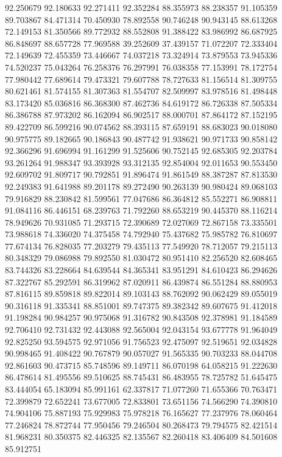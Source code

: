 92.250679
92.180633
92.271411
92.352284
88.355973
88.238357
91.105359
89.703867
84.471314
70.450930
78.892558
90.746248
90.943145
88.613268
72.149153
81.350566
89.772932
88.552808
91.388422
83.986992
86.687925
86.848697
88.657728
77.969588
39.252609
37.439157
71.072207
72.333404
72.149639
72.455359
73.446667
74.037218
73.324914
73.879553
73.945336
74.520237
75.043264
76.258376
76.297991
76.038358
77.153991
78.172754
77.980442
77.689614
79.473321
79.607788
78.727633
81.156514
81.309755
80.621461
81.574155
81.307363
81.554707
82.509997
83.978516
81.498448
83.173420
85.036816
86.368300
87.462736
84.619172
86.726338
87.505334
86.386788
87.973202
86.162094
86.902517
88.000701
87.864172
87.152195
89.422709
86.599216
90.074562
88.393115
87.659191
88.683023
90.018080
90.975775
89.182665
90.186843
90.487742
91.938621
90.971733
90.858142
92.366296
91.696994
91.161299
91.525606
90.752145
92.685305
92.203784
93.261264
91.988347
93.393928
93.312135
92.854004
92.011653
90.553450
92.609702
91.809717
90.792851
91.896474
91.861549
88.387287
87.813530
92.249383
91.641988
89.201178
89.272490
90.263139
90.980424
89.068103
79.916829
88.230842
81.599561
77.047686
86.364812
85.552271
86.908811
91.084116
86.446151
68.239763
71.792260
88.653219
90.445370
88.116214
78.949626
70.931085
71.293715
72.390689
72.027069
72.867158
73.335501
73.988618
74.336020
74.375458
74.792940
75.437682
75.985782
76.810697
77.674134
76.828035
77.203279
79.435113
77.549920
78.712057
79.215113
80.348329
79.086988
79.892550
81.030472
80.951410
82.256520
82.608465
83.744326
83.228664
84.639544
84.365341
83.951291
84.610423
86.294626
87.322767
85.292591
86.319962
87.020911
86.439874
86.551284
88.880953
87.816115
89.859818
89.822014
89.103143
88.762092
90.062429
89.055019
90.316118
91.335341
88.851001
89.747375
89.382342
89.607675
91.412018
91.198284
90.984257
90.975068
91.316782
90.843508
92.378981
91.184589
92.706410
92.731432
92.443088
92.565004
92.043154
93.677778
91.964049
92.825250
93.594575
92.971056
91.756523
92.475097
92.519651
92.034828
90.998465
91.408422
90.767879
90.057027
91.565335
90.703233
88.044708
92.861603
90.473715
85.748596
89.149711
86.070198
64.058215
91.222630
86.478614
81.495556
89.510625
88.745431
86.483955
78.725782
51.645475
83.444054
65.183094
85.991161
62.337817
71.077260
71.655366
70.763471
72.399879
72.652241
73.677005
72.833801
73.651156
74.566290
74.390810
74.904106
75.887193
75.929983
75.978218
76.165627
77.237976
78.060464
77.246824
78.872744
77.950456
79.246504
80.268473
79.794575
82.421514
81.968231
80.350375
82.446325
82.135567
82.260418
83.406409
84.501608
85.912751
